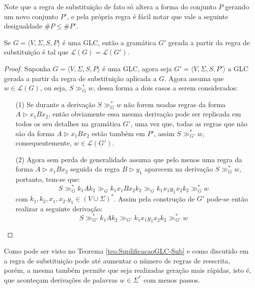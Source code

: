Note que a regra de substituição de fato só altera a forma do conjunto $P$ gerando um novo conjunto $P'$, e pela própria regra é fácil notar que vale a seguinte desigualdade $\# P \leq \# P'$. 

\begin{theorem}\label{teo:SuplificacaoGLC-Sub}
    Se $G = \langle V, \Sigma, S, P\rangle$ é uma GLC, então a gramática $G'$ gerada a partir da regra de substituição é tal que $\mathcal{L}(G) = \mathcal{L}(G')$.
\end{theorem}

\begin{proof}
    Suponha $G = \langle V, \Sigma, S, P\rangle$ é uma GLC, agora seja $G' = \langle V, \Sigma, S, P'\rangle$ a GLC gerada a partir da regra de substituição aplicada a $G$. Agora assuma que $w \in \mathcal{L}(G)$, ou seja, $S \gg_G^* w$, dessa forma a dois casos a serem considerados:
    \begin{itemize}
        \item[(1)] Se durante a derivação $S \gg_G^* w$ não forem usadas regras da forma $A \rhd x_1Bx_2$, então obviamente essa mesma derivação pode ser replicada em todos os seu detalhes na gramática $G'$, uma vez que, todas as regras que não são da forma $A \rhd x_1Bx_2$ estão também em $P'$, assim $S \gg_{G'}^* w$, consequentemente, $w \in \mathcal{L}(G')$.
        \item[(2)] Agora sem perda de generalidade assuma que pelo menos uma regra da forma  $A \rhd x_1Bx_2$ seguida da regra $B \rhd y_1$ aparecem na derivação $S \gg_G^* w$, portanto, tem-se que:
        $$S \gg_G^* k_1Ak_2 \gg_{G} k_1x_1Bx_2k_2 \gg_{G} k_1x_1y_1x_2k_2 \gg^*_G w $$
        com $k_1, k_2, x_1, x_2. y_1 \in (V \cup \Sigma)^*$. Assim pela construção de $G'$ pode-se então realizar a seguinte derivação:
        $$S \gg^*_{G'} k_1Ak_2 \gg_{G'} k_1x_1y_1x_2k_2  \gg^*_{G'} w$$
    \end{itemize}
\end{proof}

Como pode ser visto no Teorema \ref{teo:SuplificacaoGLC-Sub} e como discutido em \cite{benjaLivro2010} a regra de substituição pode até aumentar o número de regras de reescrita, porém, a mesma também permite que seja realizadas geração mais rápidas, isto é, que aconteçam derivações de palavras $w \in \Sigma^*$ com menos passos.